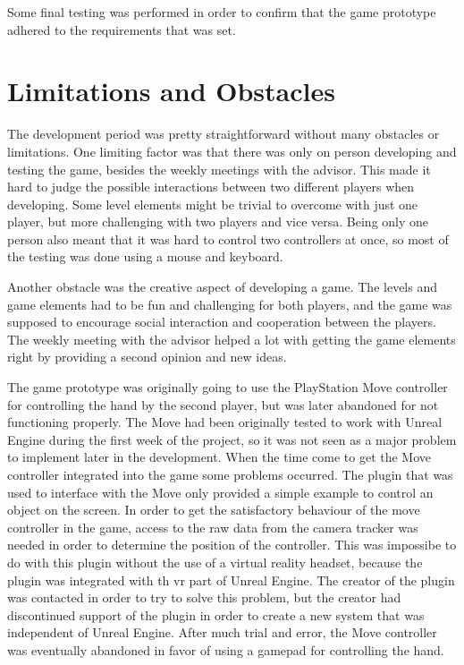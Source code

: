 Some final testing was performed in order to confirm that the game prototype adhered to the requirements that was set.

\section{Limitations and Obstacles}
\label{sec:dev_limitations}
The development period was pretty straightforward without many obstacles or limitations. One limiting factor was that there was only on person developing and testing the game, besides the weekly meetings with the advisor. This made it hard to judge the possible interactions between two different players when developing. Some level elements might be trivial to overcome with just one player, but more challenging with two players and vice versa. Being only one person also meant that it was hard to control two controllers at once, so most of the testing was done using a mouse and keyboard.

Another obstacle was the creative aspect of developing a game. The levels and game elements had to be fun and challenging for both players, and the game was supposed to encourage social interaction and cooperation between the players. The weekly meeting with the advisor helped a lot with getting the game elements right by providing a second opinion and new ideas.

The game prototype was originally going to use the PlayStation Move controller for controlling the hand by the second player, but was later abandoned for not functioning properly. The Move had been originally tested to work with Unreal Engine during the first week of the project, so it was not seen as a major problem to implement later in the development. When the time come to get the Move controller integrated into the game some problems occurred. The plugin that was used to interface with the Move only provided a simple example to control an object on the screen. In order to get the satisfactory behaviour of the move controller in the game, access to the raw data from the camera tracker was needed in order to determine the position of the controller. This was impossibe to do with this plugin without the use of a virtual reality headset, because the plugin was integrated with th \gls{vr} part of Unreal Engine. The creator of the plugin was contacted in order to try to solve this problem, but the creator had discontinued support of the plugin in order to create a new system that was independent of Unreal Engine. After much trial and error, the Move controller was eventually abandoned in favor of using a gamepad for controlling the hand.


